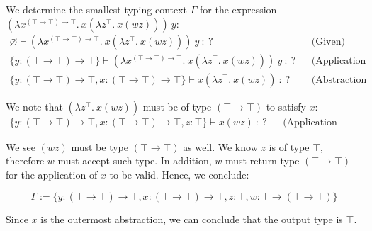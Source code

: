 \vspace{-.5em}
\begin{Example}

    We determine the smallest typing context $\Gamma$ for the expression $(\lambda x ^{(\top \to \top) \to \top} .\ x(\lambda z^{\top}.\ x(wz)))\ y$:
    \begin{align*}
         \varnothing \vdash (\lambda x ^{(\top \to \top) \to \top} .\ x(\lambda z^{\top}.\ x(wz)))\ y\ :\ ?&& \text{(Given)}\\
         \{y: (\top \to \top)\to\top\} \vdash  (\lambda x ^{(\top \to \top) \to \top} .\ x(\lambda z^{\top}.\ x(wz)))\ y\ :\ ?&& \text{(Application Arg.)}\\
            \{y: (\top \to \top)\to\top, x: (\top \to \top) \to \top\} \vdash x(\lambda z^{\top}.\ x(wz))\ :\ ?&& \text{(Abstraction Type Sub.)}
    \end{align*}

    \noindent
    We note that $(\lambda z^{\top}.\ x(wz))$ must be of type $(\top \to \top)$ to satisfy $x$:
    \begin{align*}
        \{y: (\top \to \top)\to\top, x: (\top \to \top) \to \top, z: \top\} \vdash x(wz)\ :\ ?&& \text{(Application Arg.)}
    \end{align*}

    \noindent
    We see $(wz)$ must be type $(\top \to \top)$ as well. We know $z$ is of type $\top$, therefore $w$ must accept such type. In addition, 
    $w$ must return type $(\top \to \top)$ for the application of $x$ to be valid. Hence, we conclude:
    
    $$\Gamma := \{y: (\top \to \top)\to\top, x: (\top \to \top) \to \top, z: \top, w: \top \to (\top \to \top)\}$$

    \noindent
    Since $x$ is the outermost abstraction, we can conclude that the output type is $\top$.
\end{Example}

\newpage 

